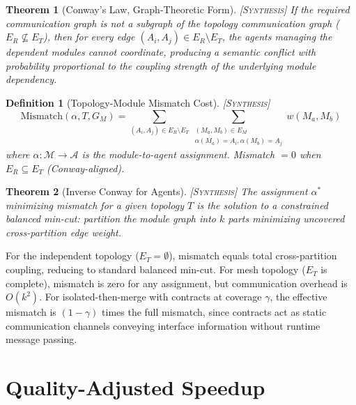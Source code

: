 \documentclass[11pt, a4paper, logo, copyright]{googledeepmind}
\newtheorem{definition}{Definition}[section]
\newtheorem{theorem}{Theorem}[section]
\newcommand{\synthesis}{\textsc{[Synthesis]}}
\begin{document}
\begin{theorem}[Conway's Law, Graph-Theoretic Form] \synthesis{}
\label{thm:conway}
If the required communication graph is not a subgraph of the topology communication graph ($E_R \not\subseteq E_T$), then for every edge $(A_i, A_j) \in E_R \setminus E_T$, the agents managing the dependent modules cannot coordinate, producing a semantic conflict with probability proportional to the coupling strength of the underlying module dependency.
\end{theorem}

\begin{definition}[Topology-Module Mismatch Cost] \synthesis{}
\begin{equation}
  \mathrm{Mismatch}(\alpha, T, G_M) = \sum_{(A_i, A_j) \in E_R \setminus E_T} \sum_{\substack{(M_a, M_b) \in E_M \\ \alpha(M_a)=A_i, \alpha(M_b)=A_j}} w(M_a, M_b)
\end{equation}
where $\alpha: \mathcal{M} \to \mathcal{A}$ is the module-to-agent assignment.
Mismatch $= 0$ when $E_R \subseteq E_T$ (Conway-aligned).
\end{definition}

\begin{theorem}[Inverse Conway for Agents] \synthesis{}
\label{thm:inverse-conway}
The assignment $\alpha^*$ minimizing mismatch for a given topology $T$ is the solution to a constrained balanced min-cut: partition the module graph into $k$ parts minimizing uncovered cross-partition edge weight.
\end{theorem}

For the independent topology ($E_T = \emptyset$), mismatch equals total cross-partition coupling, reducing to standard balanced min-cut.
For mesh topology ($E_T$ is complete), mismatch is zero for any assignment, but communication overhead is $O(k^2)$.
For isolated-then-merge with contracts at coverage $\gamma$, the effective mismatch is $(1-\gamma)$ times the full mismatch, since contracts act as static communication channels conveying interface information without runtime message passing.


\section{Quality-Adjusted Speedup}
\label{sec:qas}
\end{document}
